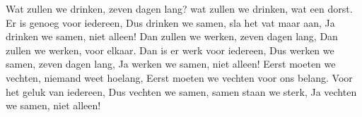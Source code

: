 \beginverse*
Wat zullen we drinken, zeven dagen lang?
wat zullen we drinken, wat een dorst. 
\endverse
\beginverse*
Er is genoeg voor iedereen,
Dus drinken we samen, sla het vat maar aan,
Ja drinken we samen, niet alleen! 
\endverse
\beginverse*
Dan zullen we werken, zeven dagen lang,
Dan zullen we werken, voor elkaar. 
\endverse
\beginverse*
Dan is er werk voor iedereen, 
Dus werken we samen, zeven dagen lang, 
Ja werken we samen, niet alleen! 
\endverse
\beginverse*
Eerst moeten we vechten, niemand weet hoelang,
Eerst moeten we vechten voor ons belang. 
\endverse
\beginverse*
Voor het geluk van iedereen,
Dus vechten we samen, samen staan we sterk,
Ja vechten we samen, niet alleen! 
\endverse
\endsong